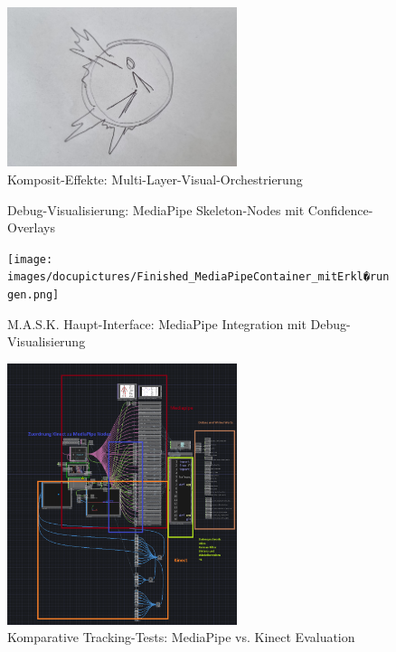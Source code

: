 \begin{figure}[!htbp]
    \centering
    \includegraphics[width=0.6\textwidth,height=0.25\textheight,keepaspectratio]{images/Sprint3_5.jpg}
    \caption{Komposit-Effekte: Multi-Layer-Visual-Orchestrierung}
    \label{fig:composite_effects}
\end{figure}

\begin{figure}[!htbp]
    \centering
    \caption{Debug-Visualisierung: MediaPipe Skeleton-Nodes mit Confidence-Overlays}
    \label{fig:debug_viz}
\end{figure}

\begin{figure}[!htbp]
    \centering
    \texttt{[image: images/docupictures/Finished\_MediaPipeContainer\_mitErkl�rungen.png]}
    \caption{M.A.S.K. Haupt-Interface: MediaPipe Integration mit Debug-Visualisierung}
    \label{fig:main_interface}
\end{figure}

\begin{figure}[!htbp]
    \centering
    \includegraphics[width=0.6\textwidth,height=0.25\textheight,keepaspectratio]{images/docupictures/KinectMediaPipe_Testing.png}
    \caption{Komparative Tracking-Tests: MediaPipe vs. Kinect Evaluation}
    \label{fig:tracking_comparison}
\end{figure}


